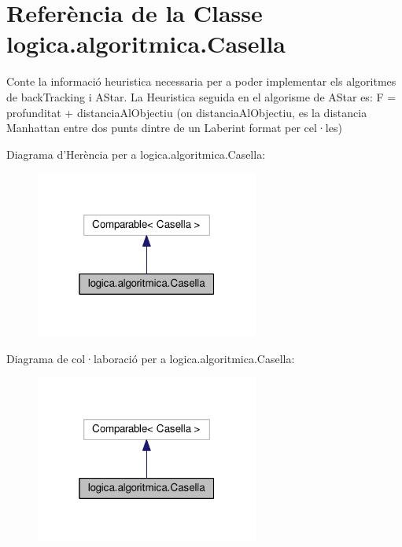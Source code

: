 \hypertarget{classlogica_1_1algoritmica_1_1_casella}{\section{Referència de la Classe logica.\+algoritmica.\+Casella}
\label{classlogica_1_1algoritmica_1_1_casella}
}


Conte la informació heuristica necessaria per a poder implementar els algoritmes de back\+Tracking i A\+Star. La Heuristica seguida en el algorisme de A\+Star es\+: F = profunditat + distancia\+Al\+Objectiu (on distancia\+Al\+Objectiu, es la distancia Manhattan entre dos punts dintre de un Laberint format per cel·les)  




Diagrama d'Herència per a logica.\+algoritmica.\+Casella\+:\nopagebreak
\begin{figure}[H]
\begin{center}
\leavevmode
\includegraphics[width=208pt]{classlogica_1_1algoritmica_1_1_casella__inherit__graph}
\end{center}
\end{figure}


Diagrama de col·laboració per a logica.\+algoritmica.\+Casella\+:\nopagebreak
\begin{figure}[H]
\begin{center}
\leavevmode
\includegraphics[width=208pt]{classlogica_1_1algoritmica_1_1_casella__coll__graph}
\end{center}
\end{figure}
